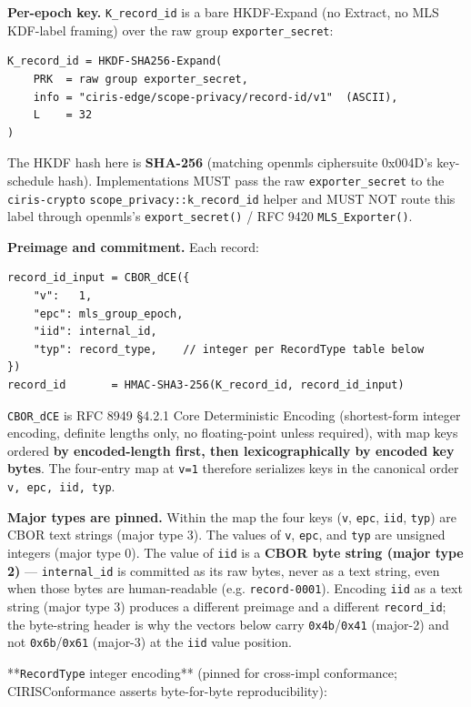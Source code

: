 \documentclass[11pt]{article}
\begin{document}
\textbf{Per-epoch key.} \texttt{K\_record\_id} is a bare HKDF-Expand (no Extract, no MLS KDF-label framing) over the raw group \texttt{exporter\_secret}:


\begin{lstlisting}
K_record_id = HKDF-SHA256-Expand(
    PRK  = raw group exporter_secret,
    info = "ciris-edge/scope-privacy/record-id/v1"  (ASCII),
    L    = 32
)
\end{lstlisting}

The HKDF hash here is \textbf{SHA-256} (matching openmls ciphersuite 0x004D's key-schedule hash). Implementations MUST pass the raw \texttt{exporter\_secret} to the \texttt{ciris-crypto} \texttt{scope\_privacy::k\_record\_id} helper and MUST NOT route this label through openmls's \texttt{export\_secret()} / RFC 9420 \texttt{MLS\_Exporter()}.


\textbf{Preimage and commitment.} Each record:


\begin{lstlisting}
record_id_input = CBOR_dCE({
    "v":   1,
    "epc": mls_group_epoch,
    "iid": internal_id,
    "typ": record_type,    // integer per RecordType table below
})
record_id       = HMAC-SHA3-256(K_record_id, record_id_input)
\end{lstlisting}

\texttt{CBOR\_dCE} is RFC 8949 §4.2.1 Core Deterministic Encoding (shortest-form integer encoding, definite lengths only, no floating-point unless required), with map keys ordered \textbf{by encoded-length first, then lexicographically by encoded key bytes}. The four-entry map at \texttt{v=1} therefore serializes keys in the canonical order \texttt{v, epc, iid, typ}.


\textbf{Major types are pinned.} Within the map the four keys (\texttt{v}, \texttt{epc}, \texttt{iid}, \texttt{typ}) are CBOR text strings (major type 3). The values of \texttt{v}, \texttt{epc}, and \texttt{typ} are unsigned integers (major type 0). The value of \texttt{iid} is a \textbf{CBOR byte string (major type 2)} — \texttt{internal\_id} is committed as its raw bytes, never as a text string, even when those bytes are human-readable (e.g. \texttt{record-0001}). Encoding \texttt{iid} as a text string (major type 3) produces a different preimage and a different \texttt{record\_id}; the byte-string header is why the vectors below carry \texttt{0x4b}/\texttt{0x41} (major-2) and not \texttt{0x6b}/\texttt{0x61} (major-3) at the \texttt{iid} value position.


**\texttt{RecordType} integer encoding** (pinned for cross-impl conformance; CIRISConformance asserts byte-for-byte reproducibility):
\end{document}
